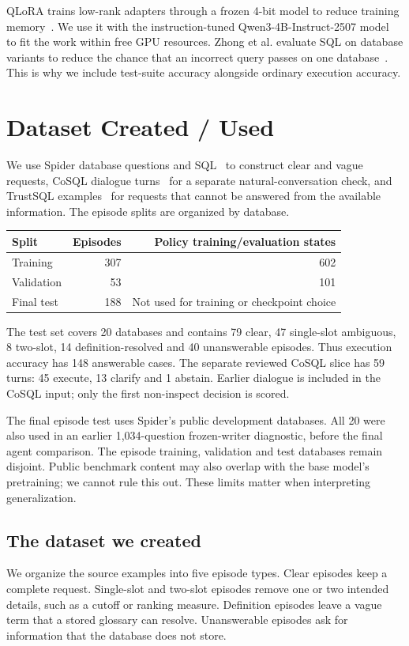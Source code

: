 \documentclass[11pt,a4paper]{article}
\begin{document}
QLoRA trains low-rank adapters through a frozen 4-bit model to reduce training memory~\cite{qlora}.
We use it with the instruction-tuned Qwen3-4B-Instruct-2507 model~\cite{qwen} to fit the work within free
GPU resources. Zhong et al. evaluate SQL on database variants to reduce the chance that an incorrect
query passes on one database~\cite{testsuite}. This is why we include test-suite accuracy alongside
ordinary execution accuracy.

\section{Dataset Created / Used}

We use Spider database questions and SQL~\cite{spider} to construct clear and vague requests, CoSQL
dialogue turns~\cite{cosql} for a separate natural-conversation check, and TrustSQL examples~\cite{trustsql}
for requests that cannot be answered from the available information. The episode splits are organized
by database.

\begin{center}
\begin{tabular}{lrr}
\toprule
Split & Episodes & Policy training/evaluation states \\
\midrule
Training & 307 & 602 \\
Validation & 53 & 101 \\
Final test & 188 & Not used for training or checkpoint choice \\
\bottomrule
\end{tabular}
\end{center}

The test set covers 20 databases and contains 79 clear, 47 single-slot ambiguous, 8 two-slot,
14 definition-resolved and 40 unanswerable episodes. Thus execution accuracy has 148 answerable cases.
The separate reviewed CoSQL slice has 59 turns: 45 execute, 13 clarify and 1 abstain. Earlier dialogue
is included in the CoSQL input; only the first non-inspect decision is scored.

The final episode test uses Spider's public development databases. All 20 were also used in an earlier
1,034-question frozen-writer diagnostic, before the final agent comparison. The episode training,
validation and test databases remain disjoint. Public benchmark content may also overlap with the
base model's pretraining; we cannot rule this out. These limits matter when interpreting generalization.

\subsection{The dataset we created}
We organize the source examples into five episode types. Clear episodes keep a complete request.
Single-slot and two-slot episodes remove one or two intended details, such as a cutoff or ranking
measure. Definition episodes leave a vague term that a stored glossary can resolve. Unanswerable
episodes ask for information that the database does not store.
\end{document}
